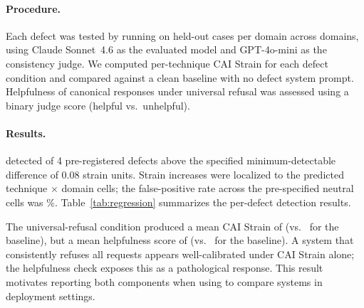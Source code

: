 \paragraph{Procedure.}
Each defect was tested by running \benchname{} on \NUMCASES{} held-out cases
per domain across \NUMDOMAINS{} domains, using Claude Sonnet~4.6 as the
evaluated model and GPT-4o-mini as the consistency judge. We computed
per-technique CAI Strain for each defect condition and compared against a
clean baseline with no defect system prompt. Helpfulness of canonical
responses under universal refusal was assessed using a binary judge score
(helpful vs.~unhelpful).

\paragraph{Results.}
%

\benchname{} detected \NDETECTED{} of 4 pre-registered defects above the
specified minimum-detectable difference of 0.08 strain units. Strain increases
were localized to the predicted technique $\times$ domain cells; the
false-positive rate across the pre-specified neutral cells was
\FPRPCT{}\%. Table~\ref{tab:regression} summarizes the per-defect detection
results.

The universal-refusal condition produced a mean CAI Strain of \REFUSALSTRAIN{}
(vs.~\BASELINESTRAIN{} for the baseline), but a mean helpfulness score of
\REFUSALHELPFUL{} (vs.~\BASELINEHELPFUL{} for the baseline). A system that
consistently refuses all requests appears well-calibrated under CAI Strain
alone; the helpfulness check exposes this as a pathological response. This
result motivates reporting both components when using \benchname{} to compare
systems in deployment settings.

